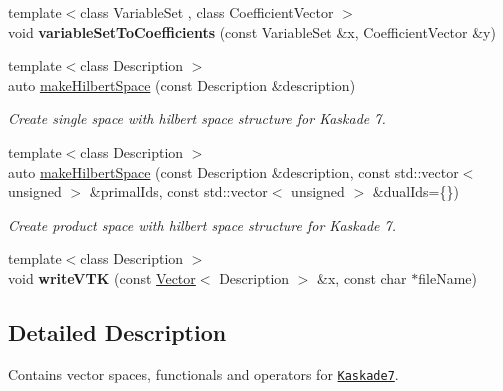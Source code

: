 \begin{DoxyCompactItemize}
\item 
\hypertarget{namespaceSpacy_1_1Kaskade_aa69d49f1744cff3e4bd945d292e32018}{{\footnotesize template$<$class Variable\-Set , class Coefficient\-Vector $>$ }\\void {\bfseries variable\-Set\-To\-Coefficients} (const Variable\-Set \&x, Coefficient\-Vector \&y)}\label{namespaceSpacy_1_1Kaskade_aa69d49f1744cff3e4bd945d292e32018}

\item 
{\footnotesize template$<$class Description $>$ }\\auto \hyperlink{group__VectorSpaceGroup_ga04d45446864bbf87770d02eade7b64cf}{make\-Hilbert\-Space} (const Description \&description)
\begin{DoxyCompactList}\small\item\em Create single space with hilbert space structure for Kaskade 7. \end{DoxyCompactList}\item 
{\footnotesize template$<$class Description $>$ }\\auto \hyperlink{group__VectorSpaceGroup_ga221db25c41371a2a823a6b569d735ef6}{make\-Hilbert\-Space} (const Description \&description, const std\-::vector$<$ unsigned $>$ \&primal\-Ids, const std\-::vector$<$ unsigned $>$ \&dual\-Ids=\{\})
\begin{DoxyCompactList}\small\item\em Create product space with hilbert space structure for Kaskade 7. \end{DoxyCompactList}\item 
\hypertarget{namespaceSpacy_1_1Kaskade_ab5f26938161de79afaba223ca4a5dfa8}{{\footnotesize template$<$class Description $>$ }\\void {\bfseries write\-V\-T\-K} (const \hyperlink{classSpacy_1_1Kaskade_1_1Vector}{Vector}$<$ Description $>$ \&x, const char $\ast$file\-Name)}\label{namespaceSpacy_1_1Kaskade_ab5f26938161de79afaba223ca4a5dfa8}

\end{DoxyCompactItemize}


\subsection{Detailed Description}
Contains vector spaces, functionals and operators for \href{http://www.zib.de/projects/kaskade7-finite-element-toolbox}{\tt Kaskade7}. 

